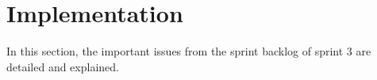 \section{Implementation}
In this section, the important issues from the sprint backlog of sprint 3 are detailed and explained.



